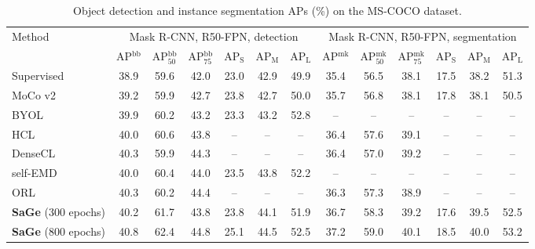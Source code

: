 \documentclass[10pt,twocolumn,letterpaper]{article}
\begin{document}
\begin{table*}[]
\renewcommand\arraystretch{1.0}
\setlength{\tabcolsep}{2.0mm}
\fontsize{9.0}{11}\selectfont
\centering
\begin{tabular}{l|cccccc|cccccc}
\toprule
\multirow{2}{*}{Method} & \multicolumn{6}{c|}{Mask R-CNN, R50-FPN, detection}  &\multicolumn{6}{c}{Mask R-CNN, R50-FPN, segmentation} \\
& AP$^{\mathrm{bb}}$  & AP$^{\mathrm{bb}}_{\mathrm{50}}$ & AP$^{\mathrm{bb}}_{\mathrm{75}}$ & AP$_{\mathrm{S}}$  & AP$_{\mathrm{M}}$ &AP$_\mathrm{L}$ &AP$^{\mathrm{mk}}$  &AP$^{\mathrm{mk}}_{\mathrm{50}}$  &AP$^{\mathrm{mk}}_{\mathrm{75}}$  &AP$_\mathrm{S}$  &AP$_\mathrm{M}$ &AP$_\mathrm{L}$ \\ \midrule

Supervised                  &38.9  &59.6  &42.0  &23.0  &42.9  &49.9    &35.4  &56.5  &38.1  &17.5  &38.2 &51.3     \\ \midrule
MoCo v2 ~\cite{chen2020improved} &39.2  &59.9 &42.7 &23.8 &42.7 &50.0    &35.7  &56.8  &38.1  &17.8  &38.1  &50.5   \\
BYOL ~\cite{grill2020bootstrap} &39.9 &60.2 &43.2 &23.3 &43.2 &52.8   &-- &--	&-- &-- &-- &--\\
HCL~\cite{HCL}  &40.0  & 60.6  &43.8  & --  & -- & -- &36.4  &57.6  & 39.1 &--  &--  &--\\
DenseCL~\cite{wang2021dense}  &40.3 &59.9 &44.3 &-- &-- &--    &36.4 &57.0 &39.2 &-- &-- &-- \\ 
self-EMD~\cite{liu2020self}  &40.0   &60.4  &44.0  &23.5  &43.8  &52.2   &-- &--	&-- &-- &-- &--\\
ORL~\cite{ORL} &40.3  &60.2  &44.4  &-- &-- &--  &36.3  &57.3  & 38.9  &-- &-- &-- \\ \midrule

\textbf{SaGe} (300 epochs) &40.2  &61.7  &43.8  &23.8  &44.1   &51.9  &36.7  &58.3  &39.2  &17.6  &39.5  &52.5 \\
\textbf{SaGe} (800 epochs) &40.8  &62.4  &44.8   &25.1  &44.5  &52.5   &37.2  &59.0  &40.1  &18.5  &40.0  &53.2  \\ 
\bottomrule
\end{tabular}
\caption{Object detection and instance segmentation APs (\%) on the MS-COCO dataset.}
\label{tab:coco}
\end{table*}
\end{document}

